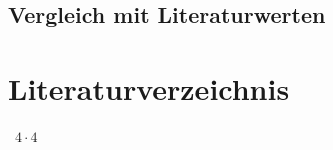 \documentclass[12pt,a4paper,titlepage,headinclude,bibtotoc]{scrartcl}
\begin{document}
\subsection{Vergleich mit Literaturwerten}

\section{Literaturverzeichnis}






         
         
         

\ $ {4} \cdot {4} $
\end{document}
